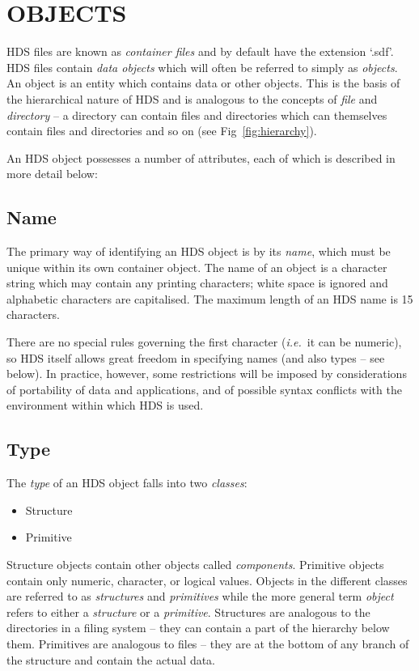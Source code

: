 \documentclass[twoside,11pt]{article}
\newcommand{\htmlref}[2]{#1}
\newcommand{\xlabel}[1]{}
\renewcommand{\_}{\texttt{\symbol{95}}}
\newcommand{\st}[1]{{\em{#1}}}
\begin{document}
\section{\xlabel{HDS_objects}\label{sect:objects}OBJECTS}

HDS files are known as \st{container files} and by default have the
extension `.sdf'.  HDS files contain \st{data objects} which will
often be referred to simply as \st{objects}. An object is an entity
which contains data or other objects. This is the basis of the
hierarchical nature of HDS and is analogous to the concepts of
\st{file} and \st{directory} -- a directory can contain files and
directories which can themselves contain files and directories and so
on (see Fig~\ref{fig:hierarchy}).

An HDS object possesses a number of attributes, each of which is
described in more detail below:

\subsection{\label{sect:name}Name}

The primary way of identifying an HDS object is by its \st{name},
which must be unique within its own container object.  The name of an
object is a character string which may contain any printing
characters; white space is ignored and alphabetic characters are
capitalised. The maximum length of an HDS name is 15 characters.

There are no special rules governing the first character
(\st{i.e.}\ it can be numeric), so HDS itself allows great freedom in specifying
names (and also types -- see \htmlref{below}{sect:type}). In practice,
however, some restrictions will be imposed by considerations of
portability of data and applications, and of possible syntax conflicts
with the environment within which HDS is used.

\subsection{\label{sect:type}Type}

The \st{type} of an HDS object falls into two \st{classes}:

\begin{itemize}
\item Structure
\item Primitive
\end{itemize}

Structure objects contain other objects called
\st{components}. Primitive objects contain only numeric, character, or
logical values. Objects in the different classes are referred to as
\st{structures} and \st{primitives} while the more general term
\st{object} refers to either a \st{structure} or a
\st{primitive}. Structures are analogous to the directories in a
filing system -- they can contain a part of the hierarchy below
them. Primitives are analogous to files -- they are at the bottom of
any branch of the structure and contain the actual data.
\end{document}
